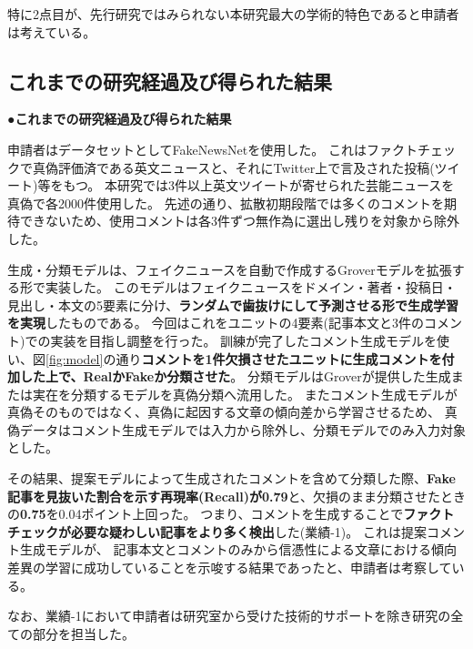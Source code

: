 {	特に2点目が、先行研究ではみられない本研究最大の学術的特色であると申請者は考えている。

	\subsection{これまでの研究経過及び得られた結果}
	\noindent
	●\textbf{これまでの研究経過及び得られた結果}

	申請者はデータセットとしてFakeNewsNet\cite{Shu2018FakeNewsNetAD, shu2017fake}を使用した。
	これはファクトチェックで真偽評価済である英文ニュースと、それにTwitter上で言及された投稿(ツイート)等をもつ。
	本研究では3件以上英文ツイートが寄せられた芸能ニュースを真偽で各2000件使用した。
	先述の通り、拡散初期段階では多くのコメントを期待できないため、使用コメントは各3件ずつ無作為に選出し残りを対象から除外した。

	生成・分類モデルは、フェイクニュースを自動で作成するGroverモデル\cite{NIPS2019_9106}を拡張する形で実装した。
	このモデルはフェイクニュースをドメイン・著者・投稿日・見出し・本文の5要素に分け、\textbf{ランダムで歯抜けにして予測させる形で生成学習を実現}したものである。
	今回はこれをユニットの4要素(記事本文と3件のコメント)での実装を目指し調整を行った。
	訓練が完了したコメント生成モデルを使い、図\ref{fig:model}の通り\textbf{コメントを1件欠損させたユニットに生成コメントを付加した上で、RealかFakeか分類させた}。
	分類モデルはGroverが提供した生成または実在を分類するモデルを真偽分類へ流用した。
	またコメント生成モデルが真偽そのものではなく、真偽に起因する文章の傾向差から学習させるため、
	真偽データはコメント生成モデルでは入力から除外し、分類モデルでのみ入力対象とした。

	その結果、提案モデルによって生成されたコメントを含めて分類した際、\textbf{Fake記事を見抜いた割合を示す再現率(Recall)が0.79}と、欠損のまま分類させたときの\textbf{0.75}を0.04ポイント上回った。
	つまり、コメントを生成することで\textbf{ファクトチェックが必要な疑わしい記事をより多く検出}した(業績-1)。
	これは提案コメント生成モデルが、
	記事本文とコメントのみから信憑性による文章における傾向差異の学習に成功していることを示唆する結果であったと、申請者は考察している。

	なお、業績-1において申請者は研究室から受けた技術的サポートを除き研究の全ての部分を担当した。

}
